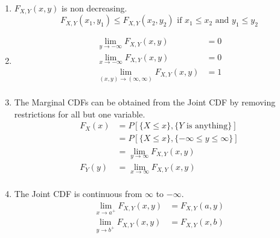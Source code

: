 \documentclass[10pt,letterpaper,final,twoside,notitlepage]{article}
\theoremstyle{plain}
\theoremstyle{definition}
\begin{document}
		\begin{enumerate}[label=\textbf{(\roman*)}, noitemsep, nolistsep]
			\item $F_{X,Y} \left( x,y \right)$ is non decreasing.
				\begin{equation} \label{eq:Joint CDF Property 1}
					F_{X,Y} \left( x_{1},y_{1} \right) \leq F_{X,Y} \left( x_{2},y_{2} \right) \text{ if } x_{1} \leq x_{2} \text{ and } y_{1} \leq y_{2}
				\end{equation}
			\item \begin{equation} \label{eq:Joint CDF Property 2}
					\begin{aligned}
						\lim\limits_{y \rightarrow -\infty} F_{X,Y} \left( x,y \right) &= 0 \\
						\lim\limits_{x \rightarrow -\infty} F_{X,Y} \left( x,y \right) &= 0 \\
						\lim\limits_{\left( x,y \right) \rightarrow \left( \infty, \infty \right)} F_{X,Y} \left( x,y \right) &= 1 \\
					\end{aligned}
				\end{equation}
			\item The Marginal CDFs can be obtained from the Joint CDF by removing restrictions for all but one variable.
				\begin{equation} \label{eq:Joint CDF Property 3}
					\begin{aligned}
						F_{X} \left( x \right) &= P \left[ \lbrace X \leq x \rbrace, \lbrace Y \text{ is anything} \rbrace \right] \\
													   &= P \left[ \lbrace X \leq x \rbrace, \lbrace -\infty \leq y \leq \infty \rbrace \right] \\
													   &= \lim\limits_{y \rightarrow \infty} F_{X,Y} \left( x,y \right) \\
						F_{Y} \left( y \right) &= \lim\limits_{x \rightarrow \infty} F_{X,Y} \left( x,y \right) \\
					\end{aligned}
				\end{equation}
			\item The Joint CDF is continuous from $\infty$ to $-\infty$.
				\begin{equation} \label{eq:Joint CDF Property 4}
					\begin{aligned}
						\lim\limits_{x \rightarrow a^{+}} F_{X,Y} \left( x,y \right) &= F_{X,Y} \left( a,y \right) \\
						\lim\limits_{y \rightarrow b^{+}} F_{X,Y} \left( x,y \right) &= F_{X,Y} \left( x,b \right) \\

\end{aligned}
\end{equation}
\end{enumerate}
\end{document}

